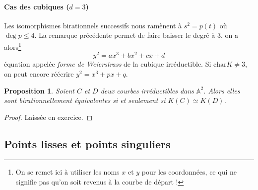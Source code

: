 \documentclass[a4paper, 11pt]{article}
\newtheorem{proposition}[théorème]{Proposition}
\theoremstyle{definition}
\newcommand{\aff}{\mathbb{A}}
\newcommand{\carac}{\textrm{char}}
\begin{document}
\paragraph{Cas des cubiques ($d=3$)} Les isomorphismes birationnels
successifs nous ramènent à $s^2 = p(t)$ où $\deg p \leq 4$. La
remarque précédente permet de faire baisser le degré à 3, on a
alors\footnote{On se remet ici à utiliser les noms $x$ et $y$ pour les
  coordonnées, ce qui ne signifie pas qu'on soit revenus à la courbe
  de départ !}
\[ y^2 = ax^3 + bx^2 + cx + d \]
équation appelée \emph{forme de Weierstrass} de la cubique
irréductible. Si $\carac K \neq 3$, on peut encore réécrire
$y^2 = x^3 + px + q$.

\begin{proposition}
  Soient $C$ et $D$ deux courbes irréductibles dans $\aff^2$. Alors
  elles sont birationnellement équivalentes si et seulement si
  $K(C) \simeq K(D)$.
\end{proposition}
\begin{proof}
  Laissée en exercice.
\end{proof}

\subsection{Points lisses et points singuliers}
\end{document}
